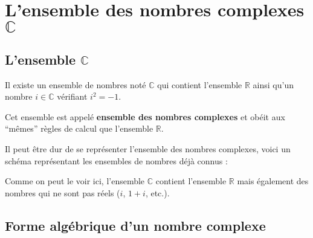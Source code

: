 






	\section{L'ensemble des nombres complexes \texorpdfstring{$\mathbb{C}$}{C}}

	\subsection{L'ensemble \texorpdfstring{$\mathbb{C}$}{C}}

	\begin{formula}
		Il existe un ensemble de nombres noté $\mathbb{C}$ qui contient l'ensemble $\mathbb{R}$ ainsi qu'un nombre $i \in \mathbb{C}$ vérifiant $i^2 = -1$.
	\end{formula}

	Cet ensemble est appelé \textbf{ensemble des nombres complexes} et obéit aux ``mêmes'' règles de calcul que l'ensemble $\mathbb{R}$.

	\begin{tip}[Schéma]
		Il peut être dur de se représenter l'ensemble des nombres complexes, voici un schéma représentant les ensembles de nombres déjà connus :

		Comme on peut le voir ici, l'ensemble $\mathbb{C}$ contient l'ensemble $\mathbb{R}$ mais également des nombres qui ne sont pas réels ($i$, $1 + i$, etc.).
	\end{tip}

	\subsection{Forme algébrique d'un nombre complexe}

